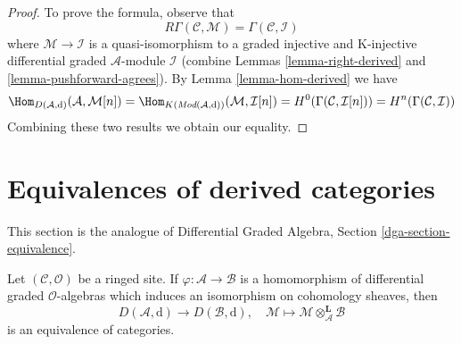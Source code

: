 \begin{proof}
To prove the formula, observe that
$$
R\Gamma(\mathcal{C}, \mathcal{M}) = \Gamma(\mathcal{C}, \mathcal{I})
$$
where $\mathcal{M} \to \mathcal{I}$ is a quasi-isomorphism
to a graded injective and K-injective differential graded
$\mathcal{A}$-module $\mathcal{I}$ (combine
Lemmas \ref{lemma-right-derived} and \ref{lemma-pushforward-agrees}).
By Lemma \ref{lemma-hom-derived} we have
$$
\Hom_{D(\mathcal{A}, \text{d})}(\mathcal{A}, \mathcal{M}[n]) =
\Hom_{K(\textit{Mod}(\mathcal{A}, \text{d}))}(\mathcal{M}, \mathcal{I}[n]) =
H^0(\Gamma(\mathcal{C}, \mathcal{I}[n])) =
H^n(\Gamma(\mathcal{C}, \mathcal{I}))
$$
Combining these two results we obtain our equality.
\end{proof}








\section{Equivalences of derived categories}
\label{section-equivalence}

\noindent
This section is the analogue of
Differential Graded Algebra, Section \ref{dga-section-equivalence}.

\begin{lemma}
\label{lemma-qis-equivalence}
Let $(\mathcal{C}, \mathcal{O})$ be a ringed site.
If $\varphi : \mathcal{A} \to \mathcal{B}$ is a homomorphism of
differential graded $\mathcal{O}$-algebras which induces an
isomorphism on cohomology sheaves, then
$$
D(\mathcal{A}, \text{d}) \longrightarrow D(\mathcal{B}, \text{d}), \quad
\mathcal{M}
\longmapsto
\mathcal{M} \otimes_\mathcal{A}^\mathbf{L} \mathcal{B}
$$
is an equivalence of categories.
\end{lemma}

